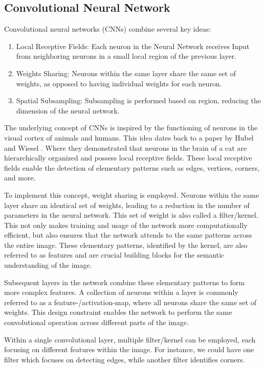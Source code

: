 \newpage

\subsection{Convolutional Neural Network}

Convolutional neural networks (CNNs) combine several key ideas:
\begin{enumerate}
    \item  Local Receptive Fields: Each neuron in the Neural Network receives Input from neighboring neurons in a small local region of the previous layer.
    \item Weights Sharing: Neurons within the same layer share the same set of weights, as opposed to having individual weights for each neuron.
    \item Spatial Subsampling: Subsampling is performed based on region, reducing the dimension of the neural network.
\end{enumerate}

The underlying concept of CNNs is inspired by the functioning of neurons in the visual cortex of animals and humans.
This idea dates back to a paper by Hubel and Wiesel \citep{hubel1962receptive}.
Where they demonstrated that neurons in the brain of a cat are hierarchically organized and possess local receptive fields. These local receptive fields enable the detection of elementary patterns such as edges, vertices, corners, and more.

To implement this concept, weight sharing is employed.
Neurons within the same layer share an identical set of weights, leading to a reduction in the number of parameters in the neural network.
This set of weight is also called a filter/kernel.
This not only makes training and usage of the network more computationally efficient, but also ensures that the network attends to the same patterns across the entire image.
These elementary patterns, identified by the kernel, are also referred to as features and are crucial building blocks for the semantic understanding of the image.

Subsequent layers in the network combine these elementary patterns to form more complex features.
A collection of neurons within a layer is commonly referred to as a feature-/activation-map, where all neurons share the same set of weights.
This design constraint enables the network to perform the same convolutional operation across different parts of the image.

Within a single convolutional layer, multiple filter/kernel can be employed, each focusing on different features within the image.
For instance, we could have one filter which focuses on detecting edges, while another filter identifies corners.

